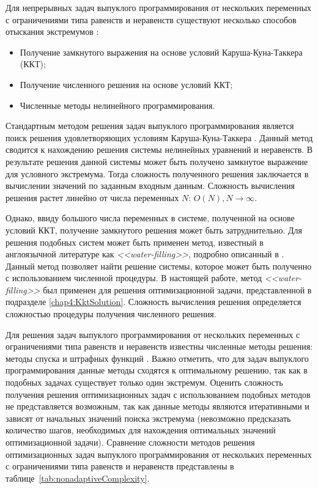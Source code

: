 Для непрерывных задач выпуклого программирования от нескольких переменных с ограничениями типа равенств и неравенств существуют несколько способов отыскания экстремумов \cite{convex_opt,optimizations_methods}:
\begin{itemize}
	\item Получение замкнутого выражения на основе условий Каруша-Куна-Таккера (ККТ);
	\item Получение численного решения на основе условий ККТ;
	\item Численные методы нелинейного программирования.
\end{itemize}

Стандартным методом решения задач выпуклого программирования является поиск решения удовлетворяющих условиям Каруша-Куна-Таккера \cite{convex_opt,optimizations_methods}. Данный метод сводится к нахождению решения системы нелинейных уравнений и неравенств. В результате решения данной системы может быть получено замкнутое выражение для условного экстремума. Тогда сложность полученного решения заключается в вычислении значений по заданным входным данным. Сложность вычисления решения растет линейно от числа переменных $N$: $O(N), N\to\infty$.

Однако, ввиду большого числа переменных в системе, полученной на основе условий ККТ, получение замкнутого решения может быть затруднительно. Для решения подобных систем может быть применен метод, известный в англоязычной литературе как \textit{<<water-filling>>}, подробно описанный в \cite{convex_opt}. Данный метод позволяет найти решение системы, которое может быть полученно с использованием численной процедуры. В настоящей работе, метод \textit{<<water-filling>>} был применен для решения оптимизационной задачи, представленной в подразделе \ref{chap4:KktSolution}. Сложность вычисления решения определяется сложностью процедуры получения численного решения.

Для решения задач выпуклого программирования от нескольких переменных с ограничениями типа равенств и неравенств известны численные методы решения: методы спуска и штрафных функций \cite{optimizations_methods}. Важно отметить, что для задач выпуклого программирования данные методы сходятся к оптимальному решению, так как в подобных задачах существует только один экстремум. Оценить сложность получения решения оптимизационных задач с использованием подобных методов не представляется возможным, так как данные методы являются итеративными и зависят от начальных значений поиска экстремума (невозможно предсказать количество шагов, необходимых для нахождения оптимальных значений оптимизационной задачи). Сравнение сложности методов решения оптимизационных задач выпуклого программирования от нескольких переменных с ограничениями типа равенств и неравенств представлены в таблице~\ref{tab:nonadaptiveComplexity}.

